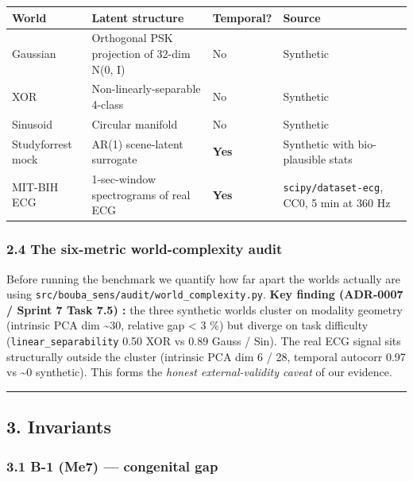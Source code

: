 \documentclass[
]{article}
\newcounter{none} %
\begin{document}
{\def\LTcaptype{none} %
\begin{longtable}[]{@{}llll@{}}
\toprule\noalign{}
World & Latent structure & Temporal? & Source \\
\midrule\noalign{}
\endhead
\bottomrule\noalign{}
\endlastfoot
Gaussian & Orthogonal PSK projection of 32-dim N(0, I) & No &
Synthetic \\
XOR & Non-linearly-separable 4-class & No & Synthetic \\
Sinusoid & Circular manifold & No & Synthetic \\
Studyforrest mock & AR(1) scene-latent surrogate & \textbf{Yes} &
Synthetic with bio-plausible stats \\
MIT-BIH ECG & 1-sec-window spectrograms of real ECG & \textbf{Yes} &
\texttt{scipy/dataset-ecg}, CC0, 5 min at 360 Hz \\
\end{longtable}
}

\subsubsection{2.4 The six-metric world-complexity
audit}\label{24-the-six-metric-world-complexity-audit}

Before running the benchmark we quantify how far apart the worlds
actually are using \texttt{src/bouba\_sens/audit/world\_complexity.py}.
\textbf{Key finding (ADR-0007 / Sprint 7 Task 7.5) :} the three
synthetic worlds cluster on modality geometry (intrinsic PCA dim
\textasciitilde30, relative gap \textless{} 3 \%) but diverge on task
difficulty (\texttt{linear\_separability} 0.50 XOR vs 0.89 Gauss / Sin).
The real ECG signal sits structurally outside the cluster (intrinsic PCA
dim 6 / 28, temporal autocorr 0.97 vs \textasciitilde0 synthetic). This
forms the \emph{honest external-validity caveat} of our evidence.

\begin{center}\rule{0.5\linewidth}{0.5pt}\end{center}

\subsection{3. Invariants}\label{3-invariants}

\subsubsection{3.1 B-1 (Me7) --- congenital
gap}\label{31-b-1-me7--congenital-gap}
\end{document}

